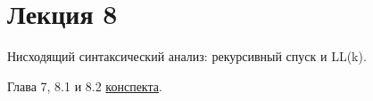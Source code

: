 \section{Лекция 8}
 
Нисходящий синтаксический анализ: рекурсивный спуск и LL(k).


Глава 7, 8.1 и 8.2 \href{https://github.com/YaccConstructor/articles/blob/master/InProgress/Formal_langs_CFPQ_course_notes/Formal_lang_CFPQ_course_notes.pdf}{конспекта}.
